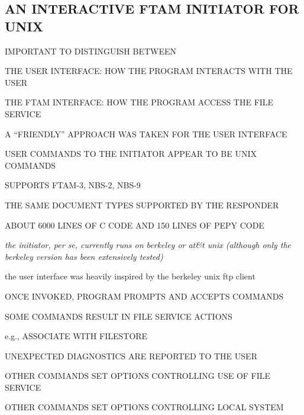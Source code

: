 \begin{bwslide}
\part*	{AN INTERACTIVE FTAM INITIATOR FOR UNIX}%

\begin{nrtc}\small
\item	IMPORTANT TO DISTINGUISH BETWEEN
    \begin{nrtc}
    \item	THE USER INTERFACE: HOW THE PROGRAM INTERACTS WITH THE USER

    \item	THE FTAM INTERFACE: HOW THE PROGRAM ACCESS THE FILE SERVICE
    \end{nrtc}

\item	A ``FRIENDLY'' APPROACH WAS TAKEN FOR THE USER INTERFACE
    \begin{nrtc}
    \item	USER COMMANDS TO THE INITIATOR APPEAR TO BE UNIX COMMANDS
    \end{nrtc}

\item	SUPPORTS FTAM-3, NBS-2, NBS-9
    \begin{nrtc}
    \item	THE SAME DOCUMENT TYPES SUPPORTED BY THE RESPONDER
    \end{nrtc}

\item	ABOUT 6000 LINES OF C CODE AND 150 LINES OF PEPY CODE
\end{nrtc}
\end{bwslide}


\begin{note}\em
the initiator, per se, currently runs on berkeley or at\&t unix
(although only the berkeley version has been extensively tested)

the user interface was heavily inspired by the berkeley unix ftp client
\end{note}


\begin{bwslide}

\begin{nrtc}
\item	ONCE INVOKED, PROGRAM PROMPTS AND ACCEPTS COMMANDS

\item	SOME COMMANDS RESULT IN FILE SERVICE ACTIONS
    \begin{nrtc}
    \item	e.g., ASSOCIATE WITH FILESTORE

    \item	UNEXPECTED DIAGNOSTICS ARE REPORTED TO THE USER
    \end{nrtc}

\item	OTHER COMMANDS SET OPTIONS CONTROLLING USE OF FILE SERVICE

\item	OTHER COMMANDS SET OPTIONS CONTROLLING LOCAL SYSTEM
\end{nrtc}
\end{bwslide}


